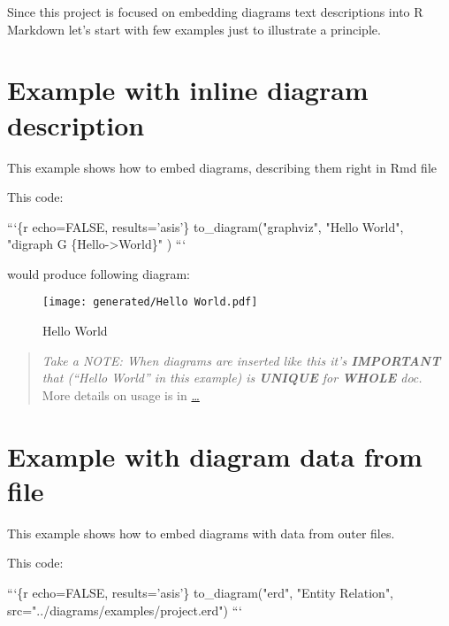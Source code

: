 \documentclass[12pt,a4paper,12pt,oneside,openany]{book}
\newenvironment{Shaded}{\begin{snugshade}}{\end{snugshade}}
\newcommand{\DataTypeTok}[1]{\textcolor[rgb]{0.27,0.27,0.27}{#1}}
\newcommand{\StringTok}[1]{\textcolor[rgb]{0.5,0.5,0.5}{#1}}
\begin{document}
Since this project is focused on embedding diagrams text descriptions into R Markdown let's start with few examples just to illustrate a principle.

\section{Example with inline diagram description}\label{example-with-inline-diagram-description}

This example shows how to embed diagrams, describing them right in Rmd file

This code:

\begin{Shaded}
\begin{Highlighting}[]
\StringTok{```}\DataTypeTok{\{r echo=FALSE, results='asis'\}}
\DataTypeTok{  to_diagram("graphviz", "Hello World",}
\DataTypeTok{  "digraph G \{Hello->World\}"}
\DataTypeTok{  )}
\StringTok{```}
\end{Highlighting}
\end{Shaded}

would produce following diagram:

\begin{figure}
\centering
\texttt{[image: generated/Hello World.pdf]}
\caption{Hello World}
\end{figure}

\begin{quote}
\emph{Take a NOTE: When diagrams are inserted like this it's \textbf{IMPORTANT} that (``Hello World'' in this example) is \textbf{UNIQUE} for \textbf{WHOLE} doc.}\\
More details on usage is in \href{TODO:}{\ldots{}}
\end{quote}

\newpage

\section{Example with diagram data from file}\label{example-with-diagram-data-from-file}

This example shows how to embed diagrams with data from outer files.

This code:

\begin{Shaded}
\begin{Highlighting}[]
\StringTok{```}\DataTypeTok{\{r echo=FALSE, results='asis'\}}
\DataTypeTok{  to_diagram("erd", "Entity Relation", src="../diagrams/examples/project.erd")}
\StringTok{```}
\end{Highlighting}
\end{Shaded}
\end{document}
